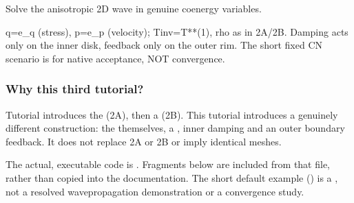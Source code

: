 \documentclass[letterpaper,10pt,english]{sphinxmanual}
\begin{document}
\begin{fulllineitems}
\label{\detokenize{examples/wave_coenergy:examples.wave_coenergy.wave_coenergy_eq}}
\pysigstartsignatures
\pysiglinewithargsret
{}
{\sphinxparamcomma {}\sphinxparamcomma {}\sphinxparamcomma {}\sphinxparamcomma {}}
{}
\pysigstopsignatures
\sphinxAtStartPar
Solve the anisotropic 2D wave in genuine co\sphinxhyphen{}energy variables.

\sphinxAtStartPar
q=e\_q (stress), p=e\_p (velocity); Tinv=T**(\sphinxhyphen{}1), rho as in 2A/2B.
Damping acts only on the inner disk, feedback only on the outer rim.
The short fixed CN scenario is for native acceptance, NOT convergence.

\end{fulllineitems}



\subsubsection{Why this third tutorial?}
\label{\detokenize{examples/wave_coenergy:why-this-third-tutorial}}
\sphinxAtStartPar
Tutorial {\hyperref[\detokenize{examples/wave::doc}]{}} introduces the  (2A), then a  (2B). This tutorial introduces a genuinely different
construction: the  themselves, a , inner damping and an outer boundary feedback.
It does not replace 2A or 2B or imply identical meshes.

\sphinxAtStartPar
The actual, executable code is
. Fragments below are included from
that file, rather than copied into the documentation. The short
default example () is a , not a resolved wave\sphinxhyphen{}propagation
demonstration or a convergence study.
\end{document}
